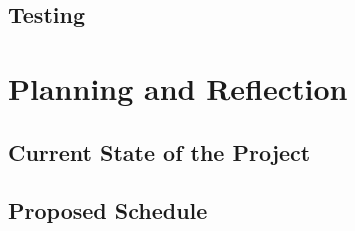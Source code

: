 \documentclass[12pt]{article}
\begin{document}
\subsection{Testing}




\section{Planning and Reflection}
\subsection{Current State of the Project}
\subsection{Proposed Schedule}



\newpage


\end{document}
